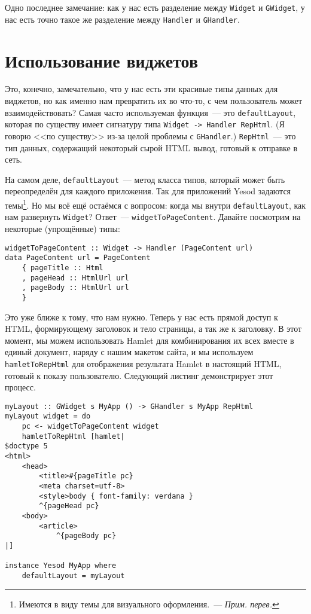 Одно последнее замечание: как у нас есть разделение между \lstinline'Widget' и
\lstinline'GWidget', у нас есть точно такое же разделение между
\lstinline'Handler' и \lstinline'GHandler'.

\section{Использование виджетов}
Это, конечно, замечательно, что у нас есть эти красивые типы данных для виджетов,
но как именно нам превратить их во что-то, с чем пользователь может
взаимодействовать? Самая часто используемая функция~--- это
\lstinline'defaultLayout', которая по существу имеет сигнатуру типа
\lstinline'Widget -> Handler RepHtml'. (Я говорю <<по существу>> из-за целой
проблемы с \lstinline'GHandler'.) \lstinline'RepHtml'~--- это тип данных,
содержащий некоторый сырой HTML вывод, готовый к отправке в сеть.

На самом деле, \lstinline'defaultLayout'~--- метод класса типов, который может
быть переопределён для каждого приложения. Так для приложений Yesod задаются
темы\footnote{Имеются в виду темы для визуального оформления.~--- \emph{Прим.
перев.}}. Но мы всё ещё остаёмся с вопросом: когда мы внутри
\lstinline'defaultLayout', как нам развернуть \lstinline'Widget'? Ответ~---
\lstinline'widgetToPageContent'. Давайте посмотрим на некоторые (упрощённые)
типы:
\begin{lstlisting}
widgetToPageContent :: Widget -> Handler (PageContent url)
data PageContent url = PageContent
    { pageTitle :: Html
    , pageHead :: HtmlUrl url
    , pageBody :: HtmlUrl url
    }
\end{lstlisting}

Это уже ближе к тому, что нам нужно. Теперь у нас есть прямой доступ к HTML,
формирующему заголовок и тело страницы, а так же к заголовку. В этот момент, мы
можем использовать Hamlet для комбинирования их всех вместе в единый документ,
наряду с нашим макетом сайта, и мы используем \lstinline'hamletToRepHtml' для
отображения результата Hamlet в настоящий HTML, готовый к показу пользователю.
Следующий листинг демонстрирует этот процесс.
\begin{lstlisting}[caption={Использование \lstinline'widgetToPageContent'}]
myLayout :: GWidget s MyApp () -> GHandler s MyApp RepHtml
myLayout widget = do
    pc <- widgetToPageContent widget
    hamletToRepHtml [hamlet|
$doctype 5
<html>
    <head>
        <title>#{pageTitle pc}
        <meta charset=utf-8>
        <style>body { font-family: verdana }
        ^{pageHead pc}
    <body>
        <article>
            ^{pageBody pc}
|]

instance Yesod MyApp where
    defaultLayout = myLayout
\end{lstlisting}


